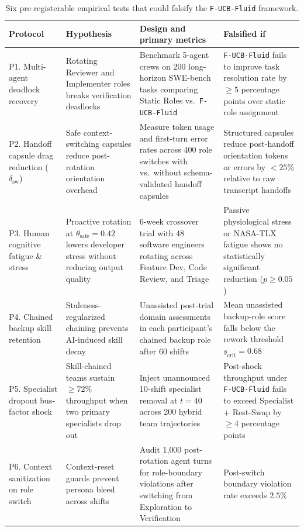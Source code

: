 \documentclass[11pt]{article}
\begin{document}
\begin{table}[ht]
\centering
\small
\caption{Six pre-registerable empirical tests that could falsify the \texttt{F-UCB-Fluid} framework.}
\label{tab:protocol}
\begin{tabularx}{\textwidth}{@{}P{2.3cm}YYY@{}}
\toprule
Protocol & Hypothesis & Design and primary metrics & Falsified if \\
\midrule
P1. Multi-agent deadlock recovery & Rotating Reviewer and Implementer roles breaks verification deadlocks \citep{cemri2025mast, lai2026clasharness} & Benchmark 5-agent crews on 200 long-horizon SWE-bench tasks comparing Static Roles vs.\ \texttt{F-UCB-Fluid} & \texttt{F-UCB-Fluid} fails to improve task resolution rate by $\ge 5$ percentage points over static role assignment\\
P2. Handoff capsule drag reduction ($\delta_{\mathrm{sw}}$) & Safe context-switching capsules \citep{das2026safecontext} reduce post-rotation orientation overhead & Measure token usage and first-turn error rates across 400 role switches with vs.\ without schema-validated handoff capsules & Structured capsules reduce post-handoff orientation tokens or errors by $<25\%$ relative to raw transcript handoffs\\
P3. Human cognitive fatigue \& stress & Proactive rotation at $\theta_{\mathrm{safe}}=0.42$ lowers developer stress without reducing output quality & 6-week crossover trial with 48 software engineers rotating across Feature Dev, Code Review, and Triage \citep{acan2026stress, zhi2026timeconstraints} & Passive physiological stress or NASA-TLX fatigue shows no statistically significant reduction ($p \ge 0.05$)\\
P4. Chained backup skill retention & Staleness-regularized chaining prevents AI-induced skill decay \citep{jaber1996learning, shen2026coding} & Unassisted post-trial domain assessments in each participant's chained backup role after 60 shifts & Mean unassisted backup-role score falls below the rework threshold $\underline{s}_{\mathrm{crit}} = 0.68$\\
P5. Specialist dropout bus-factor shock & Skill-chained teams sustain $\ge 72\%$ throughput when two primary specialists drop out & Inject unannounced 10-shift specialist removal at $t=40$ across 200 hybrid team trajectories & Post-shock throughput under \texttt{F-UCB-Fluid} fails to exceed Specialist + Rest-Swap by $\ge 4$ percentage points\\
P6. Context sanitization on role switch & Context-reset guards \citep{das2026safecontext, rodrigues2026drift} prevent persona bleed across shifts & Audit 1{,}000 post-rotation agent turns for role-boundary violations after switching from Exploration to Verification & Post-switch boundary violation rate exceeds $2.5\%$\\
\bottomrule\end{tabularx}
\end{table}
\end{document}
